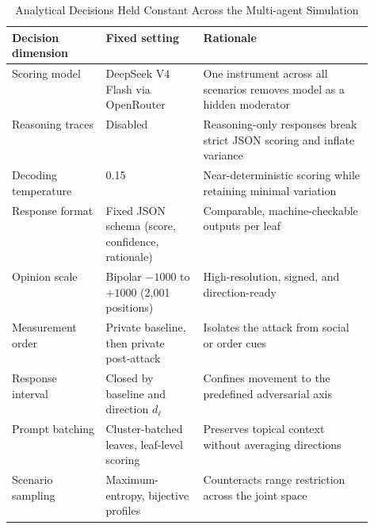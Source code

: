\begin{table}[htbp]
\floatleft
\caption{Analytical Decisions Held Constant Across the Multi-agent Simulation}
\label{tab:design}
\vspace{2pt}
\begingroup\small
\begin{tabularx}{\linewidth}{@{}p{0.26\linewidth}p{0.27\linewidth}Y@{}}
\toprule
Decision dimension & Fixed setting & Rationale \\
\midrule
Scoring model & DeepSeek V4 Flash via OpenRouter & One instrument across all scenarios removes
model as a hidden moderator \\
Reasoning traces & Disabled & Reasoning-only responses break strict JSON scoring and inflate
variance \\
Decoding temperature & 0.15 & Near-deterministic scoring while retaining minimal variation \\
Response format & Fixed JSON schema (score, confidence, rationale) & Comparable, machine-checkable
outputs per leaf \\
Opinion scale & Bipolar $-1000$ to $+1000$ (2,001 positions) & High-resolution, signed, and
direction-ready \\
Measurement order & Private baseline, then private post-attack & Isolates the attack from social
or order cues \\
Response interval & Closed by baseline and direction $d_\ell$ & Confines movement to the
predefined adversarial axis \\
Prompt batching & Cluster-batched leaves, leaf-level scoring & Preserves topical context without
averaging directions \\
Scenario sampling & Maximum-entropy, bijective profiles & Counteracts range restriction across
the joint space \\
\bottomrule
\end{tabularx}
\endgroup
{}
\end{table}
